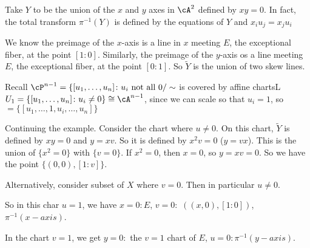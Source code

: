 

\begin{ex}
Take $Y$ to be the union of the $x$ and $y$ axes in $\cA^2$ defined by $xy=0$. In fact, the total transform $\pi^{-1}(Y)$ is defined by the equations of $Y$ and $x_iu_j= x_ju_i$




 We know the preimage of the $x$-axis is a line in $x$ meeting $E$, the exceptional fiber, at the point $[1:0]$. Similarly, the preimage of the $y$-axis os a line meeting $E$, the exceptional fiber, at the point $[0:1]$. So $\tilde{Y}$ is the union of two skew lines. 


Recall $\cP^{n-1}=\{ [u_1,\ldots,u_n] \colon u_i \text{ not all 0}/\sim$ is covered by affine chartsL $U_1= \{[u_1,\ldots,u_n] \colon u_i \neq 0\} \cong \cA^{n-1}$, since we can scale so that $u_i=1$, so $=\{[u_1,\ldots,1,u_i,\ldots, u_n]\}$

Continuing the example. Consider the chart where $u \neq 0$. On this chart, $\tilde{Y}$ is defined by $xy=0$ and $y=xv$. So it is defined by $x^2v=0$ ($y=vx$). This is the union of $\{x^2=0\}$ with $\{v=0\}$. If $x^2=0$, then $x=0$, so $y=xv=0$. So we have the point $\{(0,0),[1:v]\}$. 

Alternatively, consider subset of $X$ where $v=0$. Then in particular $u \neq 0$. 



So in this char $u=1$, we have $x=0: E$, $v=0:$ $((x,0), [1:0])$, $\pi^{-1}(x-axis)$. 

In the chart $v=1$, we get $y=0:$ the $v=1$ chart of $E$, $u=0: \pi^{-1}(y-axis)$. 
\end{ex}








